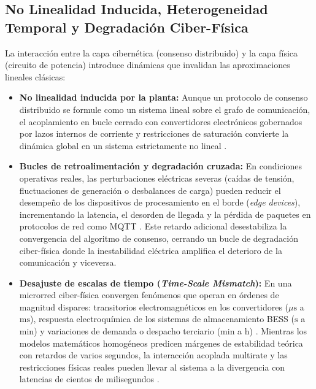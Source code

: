 \subsection{No Linealidad Inducida, Heterogeneidad Temporal y Degradación Ciber-Física}
La interacción entre la capa cibernética (consenso distribuido) y la capa física (circuito de potencia) introduce dinámicas que invalidan las aproximaciones lineales clásicas:
\begin{itemize}
    \item \textbf{No linealidad inducida por la planta:} Aunque un protocolo de consenso distribuido se formule como un sistema lineal sobre el grafo de comunicación, el acoplamiento en bucle cerrado con convertidores electrónicos gobernados por lazos internos de corriente y restricciones de saturación convierte la dinámica global en un sistema estrictamente no lineal \citep{Sowa2023, Shrivastava2023FiniteTime}.
    \item \textbf{Bucles de retroalimentación y degradación cruzada:} En condiciones operativas reales, las perturbaciones eléctricas severas (caídas de tensión, fluctuaciones de generación o desbalances de carga) pueden reducir el desempeño de los dispositivos de procesamiento en el borde (\textit{edge devices}), incrementando la latencia, el desorden de llegada y la pérdida de paquetes en protocolos de red como MQTT \citep{Olayanju2025ConsensusFreq, AlvarezLopez2026}. Este retardo adicional desestabiliza la convergencia del algoritmo de consenso, cerrando un bucle de degradación ciber-física donde la inestabilidad eléctrica amplifica el deterioro de la comunicación y viceversa.
    \item \textbf{Desajuste de escalas de tiempo (\textit{Time-Scale Mismatch}):} En una microrred ciber-física convergen fenómenos que operan en órdenes de magnitud dispares: transitorios electromagnéticos en los convertidores ($\mu\text{s}$ a $\text{ms}$), respuesta electroquímica de los sistemas de almacenamiento BESS ($\text{s}$ a $\text{min}$) y variaciones de demanda o despacho terciario ($\text{min}$ a $\text{h}$) \citep{Liu2025Multirate, Haid2022CosimCorrector}. Mientras los modelos matemáticos homogéneos predicen márgenes de estabilidad teórica con retardos de varios segundos, la interacción acoplada multirate y las restricciones físicas reales pueden llevar al sistema a la divergencia con latencias de cientos de milisegundos \citep{Olayanju2025ConsensusFreq, Kyllingstad2025CosimErrors}.
\end{itemize}

